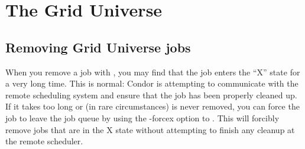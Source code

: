 \section{\label{sec:GridUniverse}The Grid Universe}







\subsection{Removing Grid Universe jobs}

When you remove a job with , you may find that the job
enters the ``X'' state for a very long time. This is normal: Condor
is attempting to communicate with the remote scheduling system and
ensure that the job has been properly cleaned up. If it takes too long
or (in rare circumstances) is never removed, you can force the job to
leave the job queue by using the -forcex option to . This
will forcibly remove jobs that are in the X state without attempting
to finish any cleanup at the remote scheduler.



